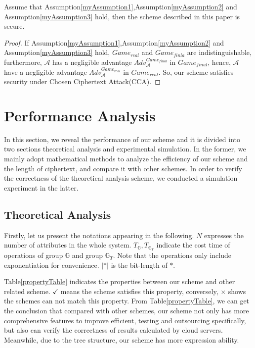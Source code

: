 \documentclass[smallextended]{svjour3}       %
\begin{document}
\begin{myDefinition}
	Assume that Assumption\ref{myAssumption1},Assumption\ref{myAssumption2} and Assumption\ref{myAssumption3} hold, then the scheme described in this paper is secure.
\end{myDefinition}
\begin{proof}
	If Assumption\ref{myAssumption1},Assumption\ref{myAssumption2} and Assumption\ref{myAssumption3} hold, $Game_{real}$ and $Game_{finla}$ are indistinguishable, furthermore, $\mathcal{A}$ has a negligible advantage $Adv_{\mathcal{A}}^{Game_{final}}$ in $Game_{final}$, hence, $\mathcal{A}$ have a negligible advantage $Adv_{\mathcal{A}}^{Game_{real}}$ in $Game_{real}$. So, our scheme satisfies security under Chosen Ciphertext Attack(CCA). 
\end{proof}
\section{Performance Analysis}\label{section5}
In this section, we reveal the performance of our scheme and it is divided into two sections theoretical analysis and experimental simulation. 
In the former, we mainly adopt mathematical methods to analyze the efficiency of our scheme and the length of ciphertext, and compare it with other schemes. 
In order to verify the correctness of the theoretical analysis scheme, we conducted a simulation experiment in the latter. 

\subsection{Theoretical Analysis}
Firstly, let us present the notations appearing in the following. 
$N$ expresses the number of attributes in the whole system. 
$T_{\mathbb{G}},T_{\mathbb{G}_T}$ indicate the cost time of operations of group $\mathbb{G}$ and group $\mathbb{G}_T$. 
Note that the operations only include exponentiation for convenience. 
$|*|$ is the bit-length of $*$. 

Table\ref{propertyTable} indicates the properties between our scheme and other related scheme. 
$\checkmark$ means the scheme satisfies this property, conversely, $\times$ shows the schemes can not match this property. 
From Table\ref{propertyTable}, we can get the conclusion that compared with other schemes, our scheme not only has more comprehensive features to improve efficient, testing and outsourcing specifically, but also can verify the correctness of results calculated by cloud servers.
Meanwhile, due to the tree structure, our scheme has more expression ability.  
\end{document}
